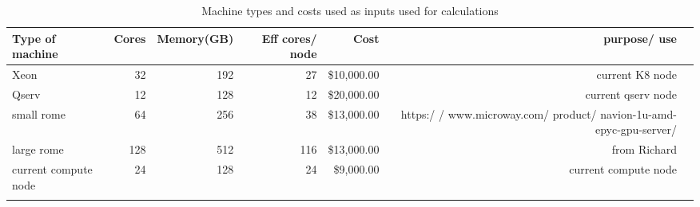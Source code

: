 \tiny \begin{longtable} { |p{}  |r  |r  |r  |r  |r  |r |} 
\caption{Machine types and costs used as inputs used for calculations \label{tab:Machines}}\\ 
\hline 
\textbf{Type of machine }&\textbf{Cores}&\textbf{Memory(GB)}&\textbf{Eff cores/ node}&\textbf{Cost}&\textbf{purpose/ use } \\ \hline
{Xeon }&{32}&{192}&{27}&{\$10,000.00}&{current K8 node } \\ \hline
{Qserv }&{12}&{128}&{12}&{\$20,000.00}&{current qserv node } \\ \hline
{small rome  }&{64}&{256}&{38}&{\$13,000.00}&{https:/ / www.microway.com/ product/ navion-1u-amd-epyc-gpu-server/ } \\ \hline
{large rome }&{128}&{512}&{116}&{\$13,000.00}&{from Richard} \\ \hline
{current compute node }&{24}&{128}&{24}&{\$9,000.00}&{current compute node} \\ \hline
{}&{}&{}&{}&{}&{} \\ \hline
\end{longtable} \normalsize
